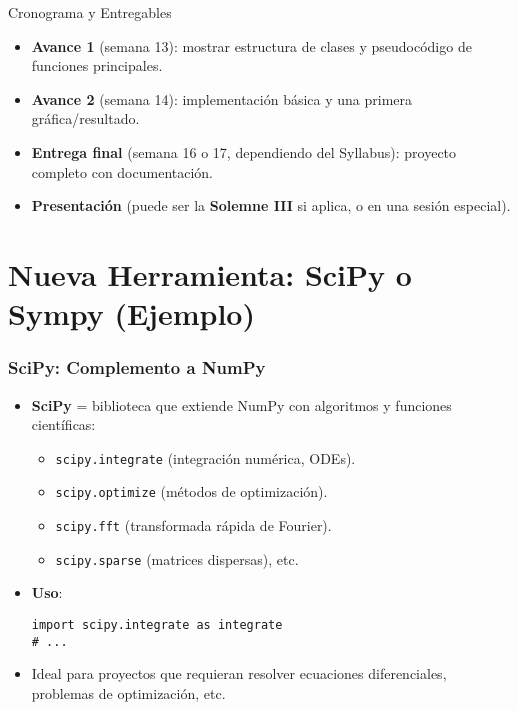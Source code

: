 \documentclass[10pt]{beamer}
\begin{document}
\begin{frame}{Cronograma y Entregables}
  \begin{itemize}
    \item \textbf{Avance 1} (semana 13): mostrar estructura de clases y pseudocódigo de funciones principales.
    \item \textbf{Avance 2} (semana 14): implementación básica y una primera gráfica/resultado.
    \item \textbf{Entrega final} (semana 16 o 17, dependiendo del Syllabus): proyecto completo con documentación.
    \item \textbf{Presentación} (puede ser la \textbf{Solemne III} si aplica, o en una sesión especial).
  \end{itemize}
\end{frame}

\section{Nueva Herramienta: SciPy o Sympy (Ejemplo)}

\begin{frame}[fragile]
\frametitle{SciPy: Complemento a NumPy}
  \begin{itemize}
    \item \textbf{SciPy} = biblioteca que extiende NumPy con algoritmos y funciones científicas:
      \begin{itemize}
        \item \texttt{scipy.integrate} (integración numérica, ODEs).
        \item \texttt{scipy.optimize} (métodos de optimización).
        \item \texttt{scipy.fft} (transformada rápida de Fourier).
        \item \texttt{scipy.sparse} (matrices dispersas), etc.
      \end{itemize}
    \item \textbf{Uso}:
	    \begin{verbatim}
import scipy.integrate as integrate
# ...
	    \end{verbatim}
    \item Ideal para proyectos que requieran resolver ecuaciones diferenciales, problemas de optimización, etc.
  \end{itemize}
\end{frame}
\end{document}
